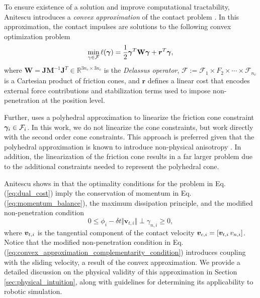 To ensure existence of a solution and improve computational tractability,
Anitescu introduces a \textit{convex approximation} of the contact
problem \cite{bib:anitescu2006}. In this approximation, the contact impulses are
solutions to the following convex optimization problem
\begin{eqnarray}
	\min_{\gamma\in \mathcal{F}} \ell(\bgamma) =
	\frac{1}{2}\bgamma^T\mathbf{W}\bgamma + {\bm r}^T
	\bgamma,
	\label{eq:dual_cost}
\end{eqnarray}
where $\mathbf{W} =
\mathbf{J}\mathbf{M}^{-1}\mathbf{J}^T\in\mathbb{R}^{3n_c\times 3n_c}$ is the
\emph{Delassus operator}, $\mathcal{F} := \mathcal{F}_1 \times F_2 \times \cdots
\times \mathcal{F}_{n_c}$ is a Cartesian product of friction cones, and ${\bm
r}$ defines a linear cost that encodes external force contributions and
stabilization terms used to impose non-penetration at the position level.

Further, \cite{bib:anitescu2006} uses a polyhedral approximation to linearize
the friction cone constraint ${\bm\gamma}_i\in\mathcal{F}_i$. In this work, we do not
linearize the cone constraints, but work directly with the second order cone
constraints. This approach is preferred given that the polyhedral
approximation is known to introduce non-physical anisotropy
\cite{bib:li2018implicit}. In addition, the linearization of the friction cone
results in a far larger problem due to the additional constraints
needed to represent the polyhedral cone.

Anitescu shows in \cite{bib:anitescu2006} that the optimality conditions for the
problem in Eq. (\ref{eq:dual_cost}) imply the conservation of momentum in Eq.
(\ref{eq:momentum_balance}), the maximum dissipation principle, and the modified
non-penetration condition
\begin{equation}
	0 \le \phi_i - \delta t \Vert {\bm v}_{t,i} \Vert \perp \gamma_{n,i} \ge 0,
	\label{eq:convex_approximation_complementarity_condition}
\end{equation}
where ${\bm{v}}_{t,i}$ is the tangential component of the contact velocity
${\bm{v}}_{c,i} = [{\bm{v}}_{t,i}\,v_{n,i}]$. Notice that the modified non-penetration
condition in Eq. (\ref{eq:convex_approximation_complementarity_condition}) 
introduces coupling with the sliding velocity, a
result of the convex approximation. We provide a detailed discussion on the
physical validity of this approximation in Section \ref{sec:physical_intuition},
along with guidelines for determining its applicability to robotic simulation.


